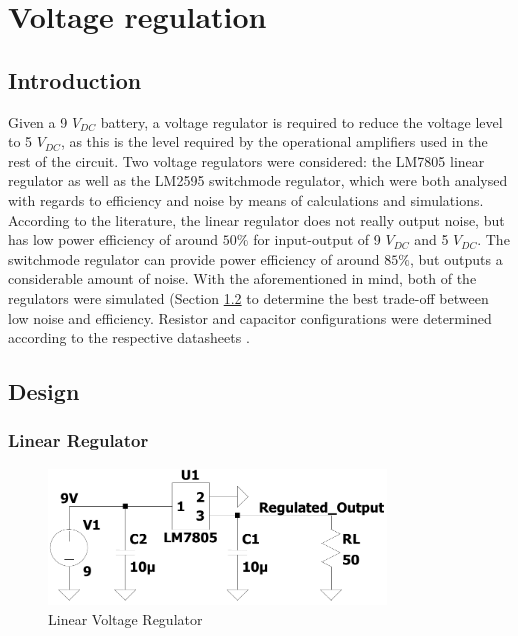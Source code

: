 \chapter{Voltage regulation}\label{ch:voltageRegulation}

\section{Introduction} \label{sec:voltIntro}

Given a 9 $V_{DC}$ battery, a voltage regulator is required to reduce the voltage level to 5 $V_{DC}$, as this is the level required by the operational amplifiers used in the rest of the circuit. Two voltage regulators were considered: the LM7805 linear regulator as well as the LM2595 switchmode regulator, which were both analysed with regards to efficiency and noise by means of calculations and simulations. According to the literature, the linear regulator does not really output noise, but has low power efficiency of around $50\%$ for input-output of 9 $V_{DC}$ and 5 $V_{DC}$\cite{lm7805}. The switchmode regulator can provide power efficiency of around $85\%$, but outputs a considerable amount of noise\cite{lm2595}. With the aforementioned in mind, both of the regulators were simulated (Section \ref{sec:voltDesign} to determine the best trade-off between low noise and efficiency. Resistor and capacitor configurations were determined according to the respective datasheets \cite{lm7805} \cite{lm2595}.

\section{Design} \label{sec:voltDesign}

	\subsection{Linear Regulator} \label{sec:linreg}
\begin{figure}[h]
    \centering
    \includegraphics[width = 0.8\textwidth]{Figures/LR.pdf}
    \caption{Linear Voltage Regulator}
    \label{fig:LR}
\end{figure}

